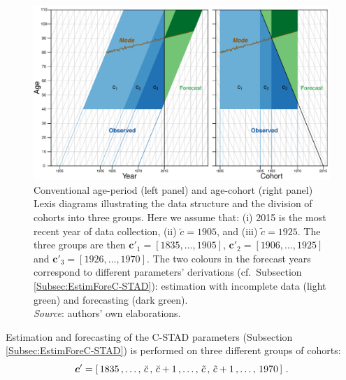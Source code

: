 \documentclass[11pt, a4paper]{article}
\newcommand{\tikzmark}[1]{\tikz[overlay,remember picture,baseline=(#1.base)]
	\node (#1) {\strut};}
\begin{document}
\begin{figure}[t]
	\begin{center}
		\includegraphics[scale=0.7]{./Figures/F3.pdf} 
		\caption{Conventional age-period (left panel) and age-cohort (right panel) Lexis diagrams illustrating the data structure and the division of cohorts into three groups. Here we assume that: (i) 2015 is the most recent year of data collection, (ii) $\breve{c}=1905$, and (iii) $\tilde{c}=1925$. The three groups are then $\bm{c}'_1=\left[1835,\dots,1905\right]$, $\bm{c}'_2=\left[1906, \dots, 1925\right]$ and $\bm{c}'_3=\left[1926, \dots, 1970\right]$. The two colours in the forecast years correspond to different parameters' derivations (cf.~Subsection \ref{Subsec:EstimForeC-STAD}): estimation with incomplete data (light green) and forecasting (dark green). \\
		\small \textit{Source}: authors' own elaborations. \label{Fig:Lexis}}    
	\end{center}
\end{figure}

\newpage

Estimation and forecasting of the C-STAD parameters (Subsection \ref{Subsec:EstimForeC-STAD}) is performed on three different groups of cohorts:
\begin{equation}\label{eq:CohortDiv}
\bm{c}' = \left[ \, \tikzmark{lowerC1}1835 \, , \dots , \, \breve{c}\tikzmark{upperC1} \, , \, \tikzmark{lowerC2}\breve{c}+1 \, , \dots, \, \tilde{c}\tikzmark{upperC2} \, , \, \tikzmark{lowerC3}\tilde{c} + 1 \, , \dots, \, 1970\tikzmark{upperC3} \, \right] \, .
\end{equation}	

\end{document}
